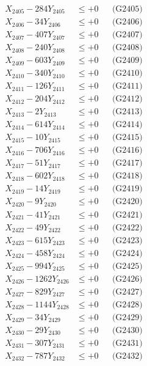 \documentclass[a4paper,10pt]{article}
\begin{document}
{\begin{align}
X_{2405} - 284Y_{2405} &\leq +0 && \text{(G2405)} \\
X_{2406} - 34Y_{2406} &\leq +0 && \text{(G2406)} \\
X_{2407} - 407Y_{2407} &\leq +0 && \text{(G2407)} \\
X_{2408} - 240Y_{2408} &\leq +0 && \text{(G2408)} \\
X_{2409} - 603Y_{2409} &\leq +0 && \text{(G2409)} \\
X_{2410} - 340Y_{2410} &\leq +0 && \text{(G2410)} \\
\allowbreak
X_{2411} - 126Y_{2411} &\leq +0 && \text{(G2411)} \\
X_{2412} - 204Y_{2412} &\leq +0 && \text{(G2412)} \\
X_{2413} - 2Y_{2413} &\leq +0 && \text{(G2413)} \\
X_{2414} - 614Y_{2414} &\leq +0 && \text{(G2414)} \\
X_{2415} - 10Y_{2415} &\leq +0 && \text{(G2415)} \\
X_{2416} - 706Y_{2416} &\leq +0 && \text{(G2416)} \\
X_{2417} - 51Y_{2417} &\leq +0 && \text{(G2417)} \\
X_{2418} - 602Y_{2418} &\leq +0 && \text{(G2418)} \\
X_{2419} - 14Y_{2419} &\leq +0 && \text{(G2419)} \\
X_{2420} - 9Y_{2420} &\leq +0 && \text{(G2420)} \\
\allowbreak
X_{2421} - 41Y_{2421} &\leq +0 && \text{(G2421)} \\
X_{2422} - 49Y_{2422} &\leq +0 && \text{(G2422)} \\
X_{2423} - 615Y_{2423} &\leq +0 && \text{(G2423)} \\
X_{2424} - 458Y_{2424} &\leq +0 && \text{(G2424)} \\
X_{2425} - 994Y_{2425} &\leq +0 && \text{(G2425)} \\
X_{2426} - 1262Y_{2426} &\leq +0 && \text{(G2426)} \\
X_{2427} - 829Y_{2427} &\leq +0 && \text{(G2427)} \\
X_{2428} - 1144Y_{2428} &\leq +0 && \text{(G2428)} \\
X_{2429} - 34Y_{2429} &\leq +0 && \text{(G2429)} \\
X_{2430} - 29Y_{2430} &\leq +0 && \text{(G2430)} \\
\allowbreak
X_{2431} - 307Y_{2431} &\leq +0 && \text{(G2431)} \\
X_{2432} - 787Y_{2432} &\leq +0 && \text{(G2432)} \\

\end{align}}
\end{document}
